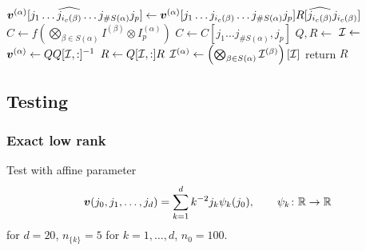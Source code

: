 \documentclass[a4wide]{article}
\begin{document}
\begin{algorithm}
\begin{algorithmic}[1]
      \State $ {\boldsymbol{v}}^{(\alpha)}[j_1 \dots \widehat{j_{i_c(\beta)}} \dots j_{\# S(\alpha)} j_p]
      \leftarrow {\boldsymbol{v}}^{(\alpha)} [j_1 \dots j_{i_c(\beta)} \dots j_{\# S(\alpha)} j_p] R[\widehat{j_{i_c(\beta)}} j_{i_c(\beta)}]$
      \Statex {}
    \EndFor
     
      \State $C \leftarrow f(\bigotimes_{\beta \in S(\alpha)} I^{(\beta)} \otimes I_p^{(\alpha)})$
      \State $C
      \leftarrow C[j_1 \dots j_{\# S(\alpha)}, j_p]$
      \State $Q, R \leftarrow$ 
      \State $\mathcal{I} \leftarrow $ 
      \State ${\boldsymbol{v}}^{(\alpha)} \leftarrow Q Q[\mathcal{I}, :]^{-1}$
      \State $R \leftarrow Q[\mathcal{I}, :] R$
      \State $\mathcal{I}^{(\alpha)} \leftarrow \left(\bigotimes_{\beta \in S(\alpha)} \mathcal{I}^{(\beta)} \right) [\mathcal{I}]$
      \Statex {}
      \State return $R$
    \EndIf
  \EndIf
\EndProcedure
\end{algorithmic}
\end{algorithm}


\subsection{Testing}

\subsubsection{Exact low rank}

Test with affine parameter
\begin{equation*}
  {\boldsymbol{v}}(j_0, j_1, \dots, j_d)
  = \sum_{k=1}^d k^{-2} j_k \psi_k(j_0)
  , \qquad \psi_k \colon \mathbb{R} \rightarrow \mathbb{R}
\end{equation*}
for $d=20$, $n_{\{k\}} = 5$ for $k=1, \dots, d$, $n_{0} = 100$.
\end{document}
